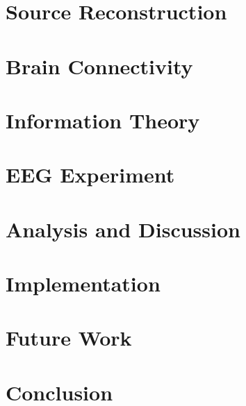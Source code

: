 \documentclass[master=mai, masteroption=ecs]{kulemt}
\begin{document}
\chapter{Source Reconstruction}\label{source-reconstruction}


\chapter{Brain Connectivity}\label{connectivity}


\chapter{Information Theory}\label{information-theory}


\chapter{EEG Experiment}\label{eeg-experiment}


\chapter{Analysis and Discussion}\label{evaluation}


\chapter{Implementation}\label{implementation}


\chapter{Future Work}\label{future-work}


\chapter{Conclusion}\label{conclusion}


\backmatter



\end{document}
